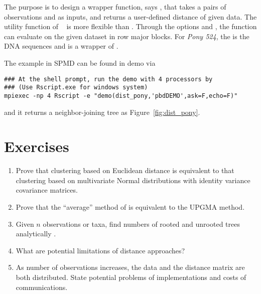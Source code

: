 The purpose is to design a wrapper function, says ,
that takes a pairs of observations  and  as inputs, and
returns a user-defined distance of given data.
The utility function 
of ~\citep{Chen2012pbdMPIpackage}
is more flexible than .
Through the options  and , the
function can evaluate  on the given dataset  in
row major blocks.
For {\it Pony 524}, the  is the DNA sequences and 
is a wrapper of .

The example in SPMD can be found in demo via
\begin{lstlisting}
### At the shell prompt, run the demo with 4 processors by
### (Use Rscript.exe for windows system)
mpiexec -np 4 Rscript -e "demo(dist_pony,'pbdDEMO',ask=F,echo=F)"
\end{lstlisting}
and it returns a neighbor-joining tree as Figure~\ref{fig:dist_pony}.



\section{Exercises}
\label{sec:pairwise_exercise}

\begin{enumerate}[label=\thechapter-\arabic*]

\item
Prove that clustering based on Euclidean distance is equivalent to that
clustering based on multivariate Normal distributions with identity variance
covariance matrices.

\item
Prove that the ``average'' method of  is equivalent to the
UPGMA method.

\item
Given $n$ observations or taxa, find numbers of rooted and unrooted trees
analytically .

\item
What are potential limitations of distance approaches?

\item
As number of observations increases, the data and the distance matrix are
both distributed. State potential problems of implementations and costs
of communications.

\end{enumerate}


